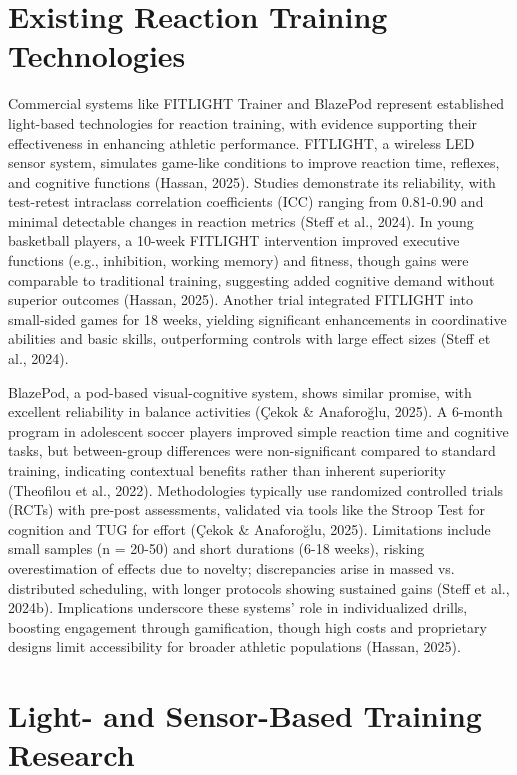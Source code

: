 \section{Existing Reaction Training Technologies}

Commercial systems like FITLIGHT Trainer and BlazePod represent established light-based technologies for reaction training, with evidence supporting their effectiveness in enhancing athletic performance. FITLIGHT, a wireless LED sensor system, simulates game-like conditions to improve reaction time, reflexes, and cognitive functions (Hassan, 2025). Studies demonstrate its reliability, with test-retest intraclass correlation coefficients (ICC) ranging from 0.81-0.90 and minimal detectable changes in reaction metrics (Steff et al., 2024). In young basketball players, a 10-week FITLIGHT intervention improved executive functions (e.g., inhibition, working memory) and fitness, though gains were comparable to traditional training, suggesting added cognitive demand without superior outcomes (Hassan, 2025). Another trial integrated FITLIGHT into small-sided games for 18 weeks, yielding significant enhancements in coordinative abilities and basic skills, outperforming controls with large effect sizes (Steff et al., 2024).

BlazePod, a pod-based visual-cognitive system, shows similar promise, with excellent reliability in balance activities (Çekok \& Anaforoğlu, 2025). A 6-month program in adolescent soccer players improved simple reaction time and cognitive tasks, but between-group differences were non-significant compared to standard training, indicating contextual benefits rather than inherent superiority (Theofilou et al., 2022). Methodologies typically use randomized controlled trials (RCTs) with pre-post assessments, validated via tools like the Stroop Test for cognition and TUG for effort (Çekok \& Anaforoğlu, 2025). Limitations include small samples (n = 20-50) and short durations (6-18 weeks), risking overestimation of effects due to novelty; discrepancies arise in massed vs. distributed scheduling, with longer protocols showing sustained gains (Steff et al., 2024b). Implications underscore these systems' role in individualized drills, boosting engagement through gamification, though high costs and proprietary designs limit accessibility for broader athletic populations (Hassan, 2025).


\section{Light- and Sensor-Based Training Research}

